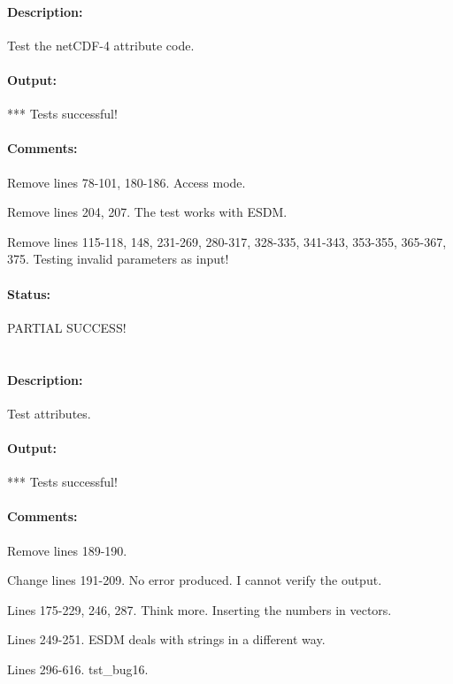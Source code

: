 \paragraph{Description:} Test the netCDF-4 attribute code.

\paragraph{Output:} *** Tests successful!

\paragraph{Comments:} Remove lines 78-101, 180-186. Access mode.

Remove lines 204, 207. The test works with ESDM.

Remove lines 115-118, 148, 231-269, 280-317, 328-335, 341-343, 353-355, 365-367, 375. Testing invalid parameters as input!

\paragraph{Status:} PARTIAL SUCCESS!

\section{}

\paragraph{Description:} Test attributes.

\paragraph{Output:} *** Tests successful!

\paragraph{Comments:} Remove lines 189-190.

Change lines 191-209. No error produced. I cannot verify the output.

Lines 175-229, 246, 287. Think more. Inserting the numbers in vectors.

Lines 249-251. ESDM deals with strings in a different way.

Lines 296-616. tst\_bug16.

